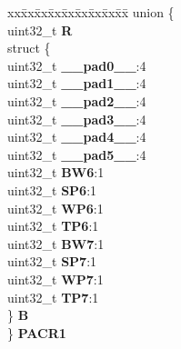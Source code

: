 \begin{DoxyCompactItemize}
\begin{tabbing}
\end{tabbing}\item 
\mbox{\label{structPBRIDGE__B__tag_a6bf8bcc88f3548b2939538373dfea0f1}} 
\begin{tabbing}
xx\=xx\=xx\=xx\=xx\=xx\=xx\=xx\=xx\=\kill
union \{\\
\>uint32\_t {\bfseries R}\\
\>struct \{\\
\>\>uint32\_t {\bfseries \_\_pad0\_\_}:4\\
\>\>uint32\_t {\bfseries \_\_pad1\_\_}:4\\
\>\>uint32\_t {\bfseries \_\_pad2\_\_}:4\\
\>\>uint32\_t {\bfseries \_\_pad3\_\_}:4\\
\>\>uint32\_t {\bfseries \_\_pad4\_\_}:4\\
\>\>uint32\_t {\bfseries \_\_pad5\_\_}:4\\
\>\>uint32\_t {\bfseries BW6}:1\\
\>\>uint32\_t {\bfseries SP6}:1\\
\>\>uint32\_t {\bfseries WP6}:1\\
\>\>uint32\_t {\bfseries TP6}:1\\
\>\>uint32\_t {\bfseries BW7}:1\\
\>\>uint32\_t {\bfseries SP7}:1\\
\>\>uint32\_t {\bfseries WP7}:1\\
\>\>uint32\_t {\bfseries TP7}:1\\
\>\} {\bfseries B}\\
\} {\bfseries PACR1}\\


\end{tabbing}
\end{DoxyCompactItemize}
